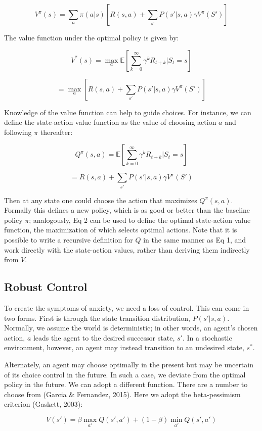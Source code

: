 \documentclass[11pt]{article} %
\begin{document}
$$ V^\pi(s) = \sum_a \pi(a|s) \left[ R(s,a) + \sum_{s'} P(s'|s,a) \gamma V^\pi (S') \right] $$

The value function under the optimal policy is given by:

$$ V^*(s) = \max_a \mathbb{E} \left[ \sum^{\infty}_{k=0} \gamma^k R_{t+k} | S_t = s \right] $$

$$ = \max_a \left[ R(s,a) + \sum_{s'} P(s'|s,a) \gamma V^\pi (S') \right] $$

Knowledge of the value function can help to guide choices. For instance, we can
define the state-action value function as the value of choosing action $a$ and
following $\pi$ thereafter:

$$ Q^\pi(s,a) = \mathbb{E} \left[ \sum^{\infty}_{k=0} \gamma^k R_{t+k} | S_t = s \right] $$

$$ = R(s,a) + \sum_{s'} P(s'|s,a) \gamma V^\pi (S') $$

Then at any state one could choose the action that maximizes $Q^\pi(s,a)$. Formally
this defines a new policy, which is as good or better than the baseline policy
$\pi$; analogously, Eq 2 can be used to define the optimal state-action value
function, the maximization of which selects optimal actions. Note that it is
possible to write a recursive definition for $Q$ in the same manner as Eq 1, and
work directly with the state-action values, rather than deriving them indirectly
from $V$.

\subsection{Robust Control}

To create the symptoms of anxiety, we need a loss of control. This can come in
two forms. First is through the state transition distribution, $P(s'|s,a)$.
Normally, we assume the world is deterministic; in other words, an agent's chosen
action, $a$ leads the agent to the desired successor state, $s'$. In a stochastic
environment, however, an agent may instead transition to an undesired state, $s^*$.

Alternately, an agent may choose optimally in the present but may be uncertain of
its choice control in the future. In such a case, we deviate from the optimal
policy in the future. We can adopt a different function. There are a number to
choose from (Garcia \& Fernandez, 2015). Here we adopt the beta-pessimism criterion
(Gaskett, 2003):

$$ V(s') = \beta \max_{a'} Q(s',a') + (1 - \beta) \min_{a'} Q(s',a') $$
\end{document}
